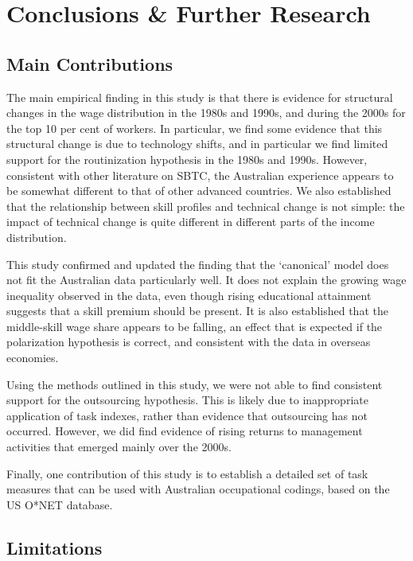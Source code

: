 \chapter{Conclusions \& Further Research}\label{ch:5}


\section{Main Contributions}

The main empirical finding in this study is that there is evidence for structural changes in the wage distribution in the 1980s and 1990s, and during the 2000s for the top 10 per cent of workers. In particular, we find some evidence that this structural change is due to technology shifts, and in particular we find limited support for the routinization hypothesis in the 1980s and 1990s. However, consistent with other literature on SBTC, the Australian experience appears to be somewhat different to that of other advanced countries. We also established that the relationship between skill profiles and technical change is not simple: the impact of technical change is quite different in different parts of the income distribution.

This study confirmed and updated the finding that the `canonical' model does not fit the Australian data particularly well. It does not explain the growing wage inequality observed in the data, even though rising educational attainment suggests that a skill premium should be present. It is also established that the middle-skill wage share appears to be falling, an effect that is expected if the polarization hypothesis is correct, and consistent with the data in overseas economies.

Using the methods outlined in this study, we were not able to find consistent support for the outsourcing hypothesis. This is likely due to inappropriate application of task indexes, rather than evidence that outsourcing has not occurred. However, we did find evidence of rising returns to management activities that emerged mainly over the 2000s.

Finally, one contribution of this study is to establish a detailed set of task measures that can be used with Australian occupational codings, based on the US O*NET database.

\section{Limitations}

